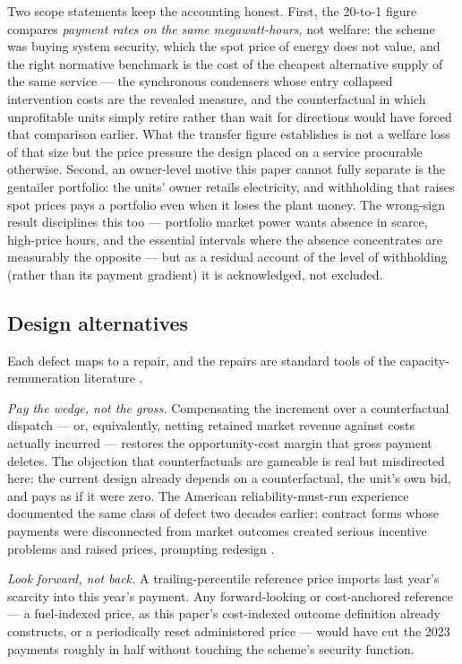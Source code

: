 Two scope statements keep the accounting honest. First, the 20-to-1 figure
compares \emph{payment rates on the same megawatt-hours}, not welfare: the
scheme was buying system security, which the spot price of energy does not
value, and the right normative benchmark is the cost of the cheapest
alternative supply of the same service --- the synchronous condensers whose
entry collapsed intervention costs are the revealed measure, and the
counterfactual in which unprofitable units simply retire rather than wait
for directions would have forced that comparison earlier. What the transfer
figure establishes is not a welfare loss of that size but the price
pressure the design placed on a service procurable otherwise. Second, an
owner-level motive this paper cannot fully separate is the gentailer
portfolio: the units' owner retails electricity, and withholding that
raises spot prices pays a portfolio even when it loses the plant money. The
wrong-sign result disciplines this too --- portfolio market power wants
absence in scarce, high-price hours, and the essential intervals where the
absence concentrates are measurably the opposite --- but as a residual
account of the level of withholding (rather than its payment gradient) it
is acknowledged, not excluded.

\subsection{Design alternatives}

Each defect maps to a repair, and the repairs are standard tools of the
capacity-remuneration literature \citep{CramtonOckenfelsStoft2013_capacity,
Fabra2018_capacity}.

\emph{Pay the wedge, not the gross.} Compensating the increment over a
counterfactual dispatch --- or, equivalently, netting retained market revenue
against costs actually incurred --- restores the opportunity-cost margin that
gross payment deletes. The objection that counterfactuals are gameable is
real but misdirected here: the current design already depends on a
counterfactual, the unit's own bid, and pays as if it were zero. The American
reliability-must-run experience documented the same class of defect two
decades earlier: contract forms whose payments were disconnected from market
outcomes created serious incentive problems and raised prices, prompting
redesign \citep{BushnellWolak1999_rmr, BushnellWolak1999_leverage}.

\emph{Look forward, not back.} A trailing-percentile reference price imports
last year's scarcity into this year's payment. Any forward-looking or
cost-anchored reference --- a fuel-indexed price, as this paper's cost-indexed
outcome definition already constructs, or a periodically reset administered
price --- would have cut the 2023 payments roughly in half without touching
the scheme's security function.

